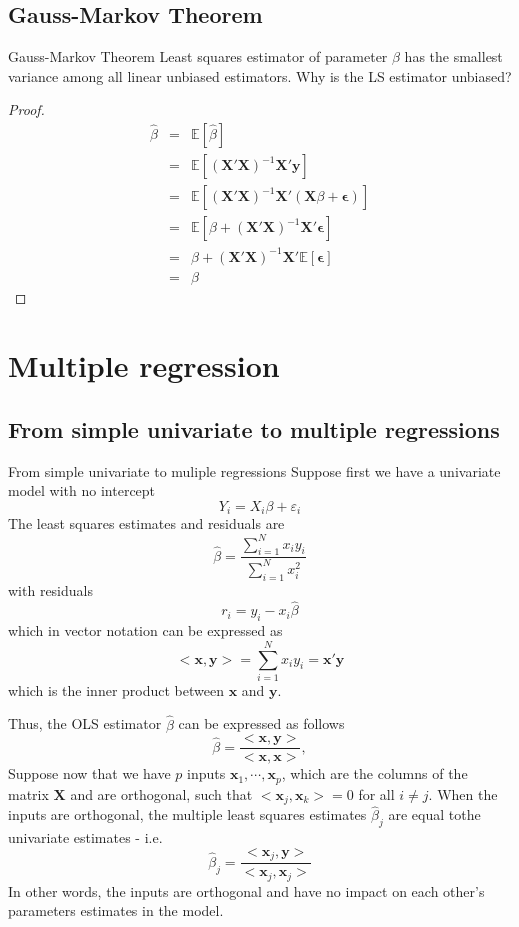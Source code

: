 \documentclass{beamer}
\newcommand{\E}{\mathbb{E}}
\begin{document}
\subsection{Gauss-Markov Theorem}
\begin{frame}{Gauss-Markov Theorem}
Least squares estimator of parameter $\beta$ has the smallest variance among all linear unbiased estimators.
Why is the LS estimator unbiased?
\begin{proof}
\begin{eqnarray*}
\hat{\beta}&=&\E[\hat{\beta}]\\
&=&\E[(\bm{X}'\bm{X})^{-1}\bm{X}'\bm{y}]\\
&=&\E[(\bm{X}'\bm{X})^{-1}\bm{X}'(\bm{X}\beta+\bm{\epsilon})]\\
&=&\E[\beta+(\bm{X}'\bm{X})^{-1}\bm{X}'\bm{\epsilon}]\\
&=&\beta+(\bm{X}'\bm{X})^{-1}\bm{X}'\E[\bm{\epsilon}]\\
&=&\beta
\end{eqnarray*}
\end{proof}
\end{frame}

\section{Multiple regression}
\subsection{From simple univariate to multiple regressions}
\begin{frame}{From simple univariate to muliple regressions}
Suppose first we have a univariate model with no intercept
\[
Y_i=X_i\beta+\varepsilon_i
\]
The least squares estimates and residuals are
\[
\hat{\beta}=\frac{\sum\limits_{i=1}^{N}x_iy_i}{\sum\limits_{i=1}^{N}x_i^2}
\]
with residuals
\[
r_i=y_i-x_i\hat{\beta}
\]
which in vector notation can be expressed as 
\[
<\bm{x},\bm{y}>=\sum\limits_{i=1}^{N}x_iy_i=\bm{x}'\bm{y}
\] 
which is the inner product between $\bm{x}$ and $\bm{y}$.
\end{frame}

\begin{frame}
Thus, the OLS estimator $\hat{\beta}$ can be expressed as follows
\[
\hat{\beta}=\frac{<\bm{x},\bm{y}>}{<\bm{x},\bm{x}>},
\]
Suppose now that we have $p$ inputs $\bm{x}_1,\cdots,\bm{x}_p$, which are the columns of the matrix $\bm{X}$ and are orthogonal, such that $<\bm{x}_j,\bm{x}_k>=0$ for all $i\neq j$. When the inputs are orthogonal, the multiple least squares estimates $\hat{\beta}_j$ are equal tothe univariate estimates - i.e. 
\[
\hat{\beta}_j=\frac{<\bm{x}_j,\bm{y}>}{<\bm{x}_j,\bm{x}_j>}
\] 
In other words, the inputs are orthogonal and have no impact on each other's parameters estimates in the model.
\end{frame}
\end{document}
